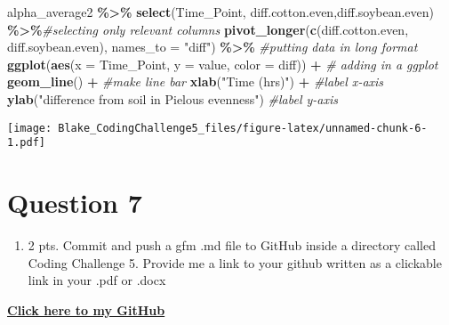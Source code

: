 \documentclass[
]{article}
\newenvironment{Shaded}{\begin{snugshade}}{\end{snugshade}}
\newcommand{\AttributeTok}[1]{\textcolor[rgb]{0.13,0.29,0.53}{#1}}
\newcommand{\CommentTok}[1]{\textcolor[rgb]{0.56,0.35,0.01}{\textit{#1}}}
\newcommand{\FunctionTok}[1]{\textcolor[rgb]{0.13,0.29,0.53}{\textbf{#1}}}
\newcommand{\NormalTok}[1]{#1}
\newcommand{\SpecialCharTok}[1]{\textcolor[rgb]{0.81,0.36,0.00}{\textbf{#1}}}
\newcommand{\StringTok}[1]{\textcolor[rgb]{0.31,0.60,0.02}{#1}}
\providecommand{\tightlist}{%
  \setlength{\itemsep}{0pt}\setlength{\parskip}{0pt}}
\begin{document}
\begin{Shaded}
\begin{Highlighting}[]
\NormalTok{alpha\_average2 }\SpecialCharTok{\%\textgreater{}\%} 
  \FunctionTok{select}\NormalTok{(Time\_Point, diff.cotton.even,diff.soybean.even) }\SpecialCharTok{\%\textgreater{}\%}\CommentTok{\#selecting only relevant columns}
  \FunctionTok{pivot\_longer}\NormalTok{(}\FunctionTok{c}\NormalTok{(diff.cotton.even, diff.soybean.even), }\AttributeTok{names\_to =} \StringTok{"diff"}\NormalTok{) }\SpecialCharTok{\%\textgreater{}\%} \CommentTok{\#putting data in long format }
  \FunctionTok{ggplot}\NormalTok{(}\FunctionTok{aes}\NormalTok{(}\AttributeTok{x =}\NormalTok{ Time\_Point, }\AttributeTok{y =}\NormalTok{ value, }\AttributeTok{color =}\NormalTok{ diff)) }\SpecialCharTok{+} \CommentTok{\# adding in a ggplot}
  \FunctionTok{geom\_line}\NormalTok{() }\SpecialCharTok{+} \CommentTok{\#make line bar}
  \FunctionTok{xlab}\NormalTok{(}\StringTok{"Time (hrs)"}\NormalTok{) }\SpecialCharTok{+} \CommentTok{\#label x{-}axis}
  \FunctionTok{ylab}\NormalTok{(}\StringTok{"difference from soil in Pielou\textquotesingle{}s evenness"}\NormalTok{) }\CommentTok{\#label y{-}axis}
\end{Highlighting}
\end{Shaded}

\texttt{[image: Blake\_CodingChallenge5\_files/figure-latex/unnamed-chunk-6-1.pdf]}

\section{Question 7}\label{question-7}

\begin{enumerate}
\def\labelenumi{\arabic{enumi}.}
\setcounter{enumi}{6}
\tightlist
\item
  2 pts. Commit and push a gfm .md file to GitHub inside a directory
  called Coding Challenge 5. Provide me a link to your github written as
  a clickable link in your .pdf or .docx
\end{enumerate}

\textbf{\href{https://github.com/kzb0180}{Click here to my GitHub}}
\end{document}
